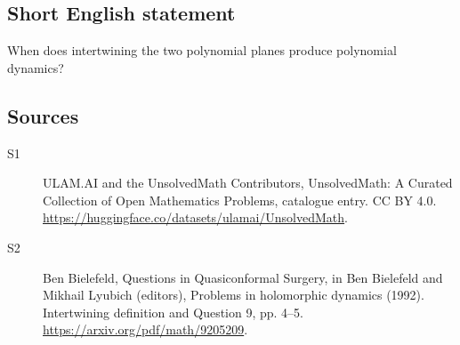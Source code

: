 \documentclass[11pt]{article}
\begin{document}
\subsection{Short English statement}
When does intertwining the two polynomial planes produce polynomial dynamics?
\subsection{Sources}
\begin{description}
\item[\hypertarget{source:statement:1}{S1}] ULAM.AI and the UnsolvedMath Contributors, UnsolvedMath: A Curated Collection of Open Mathematics Problems, catalogue entry. CC BY 4.0. \url{https://huggingface.co/datasets/ulamai/UnsolvedMath}.
\item[\hypertarget{source:statement:2}{S2}] Ben Bielefeld, Questions in Quasiconformal Surgery, in Ben Bielefeld and Mikhail Lyubich (editors), Problems in holomorphic dynamics (1992). Intertwining definition and Question 9, pp. 4–5. \url{https://arxiv.org/pdf/math/9205209}.
\end{description}
\label{end:statement}
\end{document}

